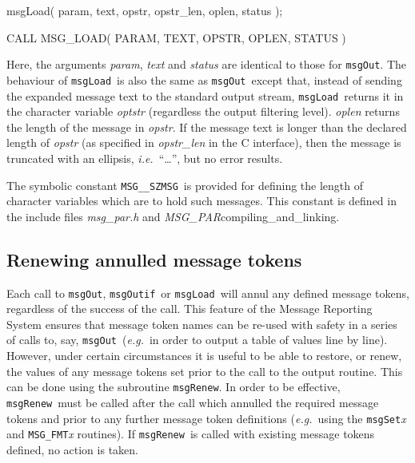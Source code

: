\documentclass[twoside,11pt]{starlink}
\providecommand{\func}[1]{\texttt{#1}}
\providecommand{\farg}[1]{\textit{#1}}
\providecommand{\const}[1]{\texttt{#1}}
\providecommand{\fname}[1]{\textit{#1}}
\providecommand{\msgszmsg}{\const{MSG\_\_SZMSG}}
\providecommand{\msgload}{\func{msgLoad}}
\providecommand{\msgout}{\func{msgOut}}
\providecommand{\msgoutif}{\func{msgOutif}}
\providecommand{\msgrenew}{\func{msgRenew}}
\begin{document}
\begin {small}
\begin{terminalv}
      msgLoad( param, text, opstr, opstr_len, oplen, status );

      CALL MSG_LOAD( PARAM, TEXT, OPSTR, OPLEN, STATUS )
\end{terminalv}
\end {small}

Here, the arguments \farg{param}, \farg{text} and \farg{status} are identical to those for \msgout.
The behaviour of \msgload\ is also the same as \msgout\ except that, instead of
sending the expanded message text to the standard output stream, \msgload\
returns it in the character variable \farg{optstr} (regardless the output filtering
level).
\farg{oplen} returns the length of the message in \farg{opstr}.
If the message text is longer than the declared length of \farg{opstr} (as
specified in \farg{opstr\_len} in the C interface), then the
message is truncated with an ellipsis, \textit{i.e.}\ ``\ldots'', but no error
results.

The symbolic constant \msgszmsg\ is provided for defining the length of
character variables which are to hold such messages.
This constant is defined in the include files
\htmlref
{\fname{msg\_par.h} and \fname{MSG\_PAR}}{compiling_and_linking}.


\subsection{Renewing annulled message tokens}

Each call to \msgout, \msgoutif\ or \msgload\ will annul any defined message
tokens, regardless of the success of the call.
This feature of the Message Reporting System ensures that message token names
can be re-used with safety in a series of calls to, say, \msgout\ (\textit{e.g.}\
in order to output a table of values line by line).
However, under certain circumstances it is useful to be able to restore, or
renew, the values of any message tokens set prior to the call to the output
routine. This can be done using the subroutine \msgrenew.
In order to be effective, \msgrenew\ must be called after the call
which annulled the required message tokens and prior to any further message
token  definitions (\textit{e.g.}\ using the \func{msgSet}\textit{x} and \func{MSG\_FMT}\textit{x}
routines).
If \msgrenew\ is called with existing message tokens defined, no action is
taken.
\end{document}
